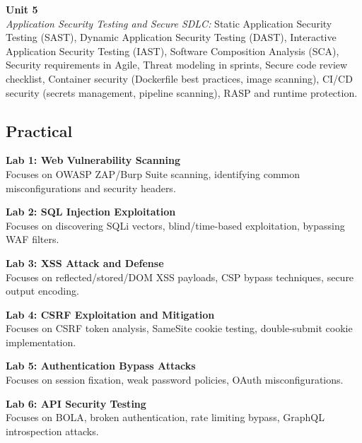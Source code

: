 \vspace{0.3cm}

\noindent\textbf{Unit 5} \\
\textit{Application Security Testing and Secure SDLC:} Static Application Security Testing (SAST), Dynamic Application Security Testing (DAST), Interactive Application Security Testing (IAST), Software Composition Analysis (SCA), Security requirements in Agile, Threat modeling in sprints, Secure code review checklist, Container security (Dockerfile best practices, image scanning), CI/CD security (secrets management, pipeline scanning), RASP and runtime protection.

\newpage

\subsection*{Practical}
\noindent\textbf{Lab 1: Web Vulnerability Scanning} \\
Focuses on OWASP ZAP/Burp Suite scanning, identifying common misconfigurations and security headers.

\vspace{0.2cm}

\noindent\textbf{Lab 2: SQL Injection Exploitation} \\
Focuses on discovering SQLi vectors, blind/time-based exploitation, bypassing WAF filters.

\vspace{0.2cm}

\noindent\textbf{Lab 3: XSS Attack and Defense} \\
Focuses on reflected/stored/DOM XSS payloads, CSP bypass techniques, secure output encoding.

\vspace{0.2cm}

\noindent\textbf{Lab 4: CSRF Exploitation and Mitigation} \\
Focuses on CSRF token analysis, SameSite cookie testing, double-submit cookie implementation.

\vspace{0.2cm}

\noindent\textbf{Lab 5: Authentication Bypass Attacks} \\
Focuses on session fixation, weak password policies, OAuth misconfigurations.

\vspace{0.2cm}

\noindent\textbf{Lab 6: API Security Testing} \\
Focuses on BOLA, broken authentication, rate limiting bypass, GraphQL introspection attacks.

